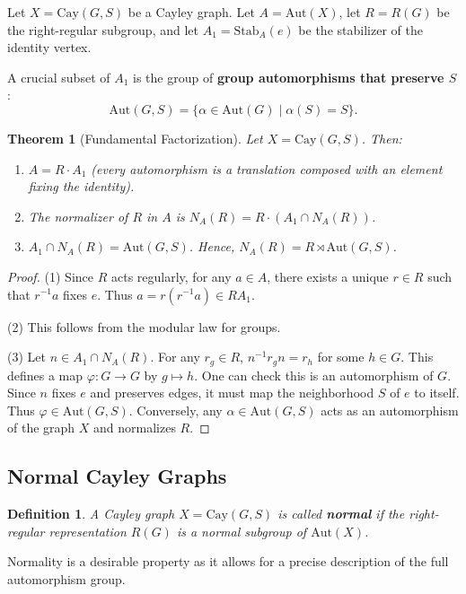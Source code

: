 \documentclass[12pt,a4paper,openany]{book}
\newtheorem{theorem}{Theorem}[section]
\newtheorem{definition}{Definition}[section]
\begin{document}
Let $X = \mathrm{Cay}(G, S)$ be a Cayley graph. Let $A = \mathrm{Aut}(X)$, let $R = R(G)$ be the right-regular subgroup, and let $A_1 = \mathrm{Stab}_A(e)$ be the stabilizer of the identity vertex.

A crucial subset of $A_1$ is the group of \textbf{group automorphisms that preserve $S$}:
\[
\mathrm{Aut}(G,S) = \{ \alpha \in \mathrm{Aut}(G) \mid \alpha(S) = S \}.
\]

\begin{theorem}[Fundamental Factorization]\label{thm:fundamental-factorization}
Let $X = \mathrm{Cay}(G, S)$. Then:
\begin{enumerate}
    \item $A = R \cdot A_1$ (every automorphism is a translation composed with an element fixing the identity).
    \item The normalizer of $R$ in $A$ is $N_A(R) = R \cdot (A_1 \cap N_A(R))$.
    \item $A_1 \cap N_A(R) = \mathrm{Aut}(G,S)$. Hence, $N_A(R) = R \rtimes \mathrm{Aut}(G,S)$.
\end{enumerate}
\end{theorem}
\begin{proof}
(1) Since $R$ acts regularly, for any $a \in A$, there exists a unique $r \in R$ such that $r^{-1}a$ fixes $e$. Thus $a = r (r^{-1}a) \in R A_1$.

(2) This follows from the modular law for groups.

(3) Let $n \in A_1 \cap N_A(R)$. For any $r_g \in R$, $n^{-1} r_g n = r_h$ for some $h \in G$. This defines a map $\varphi: G \to G$ by $g \mapsto h$. One can check this is an automorphism of $G$. Since $n$ fixes $e$ and preserves edges, it must map the neighborhood $S$ of $e$ to itself. Thus $\varphi \in \mathrm{Aut}(G,S)$. Conversely, any $\alpha \in \mathrm{Aut}(G,S)$ acts as an automorphism of the graph $X$ and normalizes $R$.
\end{proof}

\subsection{Normal Cayley Graphs}

\begin{definition}
A Cayley graph $X = \mathrm{Cay}(G, S)$ is called \textbf{normal} if the right-regular representation $R(G)$ is a normal subgroup of $\mathrm{Aut}(X)$.
\end{definition}

Normality is a desirable property as it allows for a precise description of the full automorphism group.
\end{document}
